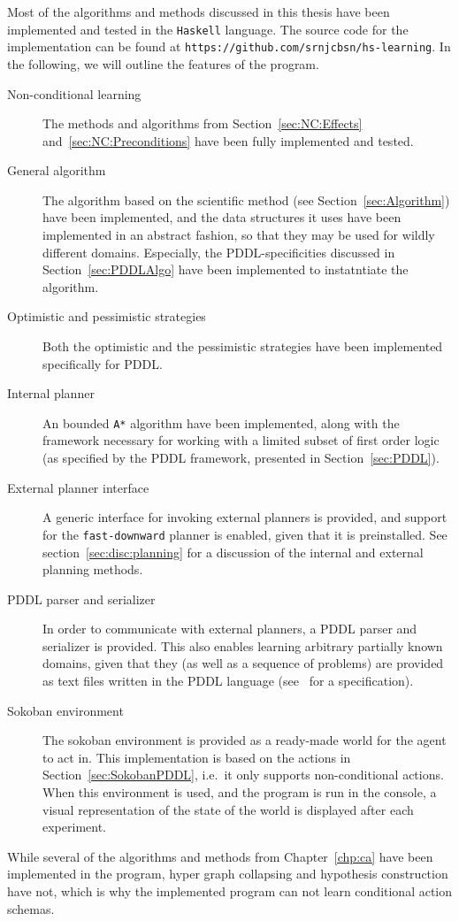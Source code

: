 \documentclass[../Master.tex]{subfiles}
\begin{document}
Most of the algorithms and methods discussed in this thesis have been implemented and tested in the \texttt{Haskell} language. The source code for the implementation can be found at \texttt{https://github.com/srnjcbsn/hs-learning}. In the following, we will outline the features of the program.

\begin{description}
    \item[Non-conditional learning] 
        The methods and algorithms from Section~\ref{sec:NC:Effects} and~\ref{sec:NC:Preconditions} have been fully implemented and tested.
    \item[General algorithm]
        The algorithm based on the scientific method (see Section~\ref{sec:Algorithm}) have been implemented, and the data structures it uses have been implemented in an abstract fashion, so that they may be used for wildly different domains. Especially, the PDDL-specificities discussed in Section~\ref{sec:PDDLAlgo} have been implemented to instatntiate the algorithm.
    \item[Optimistic and pessimistic strategies]
        Both the optimistic and the pessimistic strategies have been implemented specifically for PDDL.
    \item[Internal planner] An bounded \texttt{A*} algorithm have been implemented, along with the framework necessary for working with a limited subset of first order logic (as specified by the PDDL framework, presented in Section~\ref{sec:PDDL}).
    \item[External planner interface] A generic interface for invoking external planners is provided, and support for the \texttt{fast-downward} planner is enabled, given that it is preinstalled. See section~\ref{sec:disc:planning} for a discussion of the internal and external planning methods.
    \item[PDDL parser and serializer]
        In order to communicate with external planners, a PDDL parser and serializer is provided. This also enables learning arbitrary partially known domains, given that they (as well as a sequence of problems) are provided as text files written in the PDDL language (see~\cite{PDDL} for a specification).
    \item[Sokoban environment]
        The sokoban environment is provided as a ready-made world for the agent to act in. This implementation is based on the actions in Section~\ref{sec:SokobanPDDL}, i.e.\ it only supports non-conditional actions. When this environment is used, and the program is run in the console, a visual representation of the state of the world is displayed after each experiment.
\end{description}

While several of the algorithms and methods from Chapter~\ref{chp:ca} have been implemented in the program, hyper graph collapsing and hypothesis construction have not, which is why the implemented program can not learn conditional action schemas.
\end{document}
